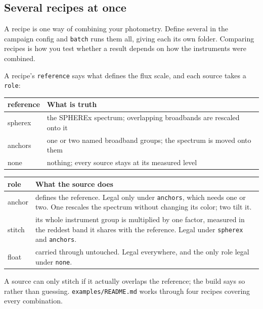\documentclass[11pt]{article}
\begin{document}
\subsection{Several recipes at once}

A recipe is one way of combining your photometry. Define several in the
campaign config and \texttt{batch} runs them all, giving each its own
folder. Comparing recipes is how you test whether a result depends on how
the instruments were combined.

A recipe's \texttt{reference} says what defines the flux scale, and each
source takes a \texttt{role}:

\begin{center}
\begin{tabular}{>{\ttfamily}l p{8.6cm}}
\toprule
\textbf{\normalfont reference} & \textbf{What is truth} \\
\midrule
spherex & the SPHEREx spectrum; overlapping broadbands are rescaled onto it \\
anchors & one or two named broadband groups; the spectrum is moved onto them \\
none & nothing; every source stays at its measured level \\
\bottomrule
\end{tabular}
\end{center}

\begin{center}
\begin{tabular}{>{\ttfamily}l p{8.6cm}}
\toprule
\textbf{\normalfont role} & \textbf{What the source does} \\
\midrule
anchor & defines the reference. Legal only under \texttt{anchors}, which
  needs one or two. One rescales the spectrum without changing its
  color; two tilt it. \\
stitch & its whole instrument group is multiplied by one factor,
  measured in the reddest band it shares with the reference. Legal under
  \texttt{spherex} and \texttt{anchors}. \\
float & carried through untouched. Legal everywhere, and the only role
  legal under \texttt{none}. \\
\bottomrule
\end{tabular}
\end{center}

A source can only stitch if it actually overlaps the reference; the
build says so rather than guessing. \texttt{examples/README.md} works
through four recipes covering every combination.
\end{document}
